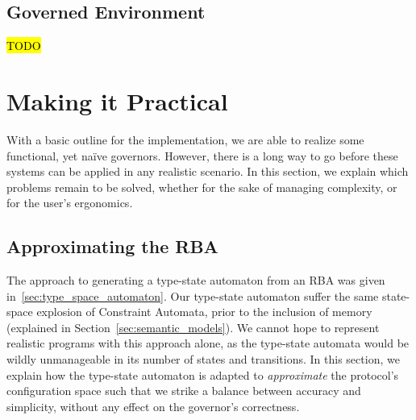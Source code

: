\subsection{Governed Environment}
\hl{TODO}

\section{Making it Practical}
With a basic outline for the implementation, we are able to realize some functional, yet na\"ive governors. However, there is a long way to go before these systems can be applied in any realistic scenario. In this section, we explain which problems remain to be solved, whether for the sake of managing complexity, or for the user's ergonomics.

\subsection{Approximating the RBA}
The approach to generating a type-state automaton from an RBA was given in~\ref{sec:type_space_automaton}. Our type-state automaton suffer the same state-space explosion of Constraint Automata, prior to the inclusion of memory (explained in Section~\ref{sec:semantic_models}). We cannot hope to represent realistic programs with this approach alone, as the type-state automata would be wildly unmanageable in its number of states and transitions. In this section, we explain how the type-state automaton is adapted to \textit{approximate} the protocol's configuration space such that we strike a balance between accuracy and simplicity, without any effect on the governor's correctness.

